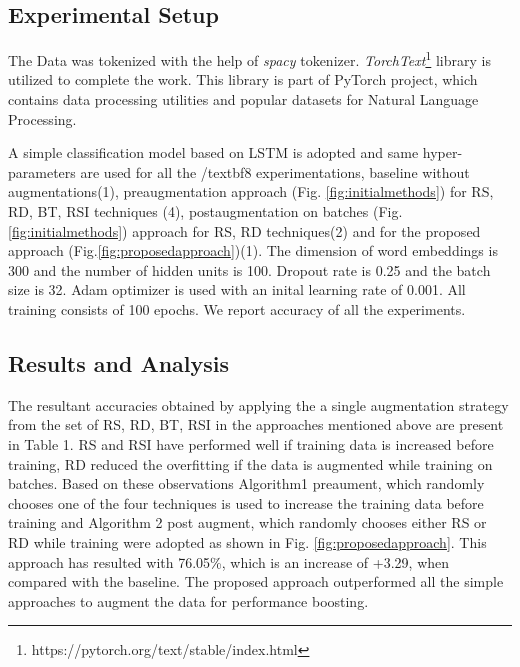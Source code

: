 \documentclass{article}
\begin{document}
\subsection{Experimental Setup}
The Data was tokenized with the help of \textit{spacy}\cite{srinivasa2018natural} tokenizer. \textit{TorchText}\footnote{https://pytorch.org/text/stable/index.html} library is utilized to complete the work. This library is part of PyTorch project, which contains data processing utilities and popular datasets for Natural Language Processing. 

A simple classification model based on LSTM is adopted and same hyper-parameters are used for all the /textbf{8} experimentations, baseline without augmentations(1), preaugmentation approach (Fig. \ref{fig:initialmethods}) for RS, RD, BT, RSI techniques (4), postaugmentation on batches (Fig. \ref{fig:initialmethods}) approach for RS, RD techniques(2) and for the proposed approach (Fig.\ref{fig:proposedapproach})(1). The dimension of word embeddings is 300 and the number of hidden units is 100. Dropout rate is 0.25 and the batch size is 32. Adam optimizer is used with an inital learning rate of 0.001. All training consists of 100 epochs. We report accuracy of all the experiments.

\subsection{Results and Analysis}
The resultant accuracies obtained by applying the a single augmentation strategy from the set of RS, RD, BT, RSI in the approaches mentioned above are present in Table 1. RS and RSI have performed well if training data is increased before training, RD reduced the overfitting if the data is augmented while training on batches. Based on these observations Algorithm1 preaument, which randomly chooses one of the four techniques is used to increase the training data before training and Algorithm 2 post augment, which randomly chooses either RS or RD while training were adopted as shown in Fig. \ref{fig:proposedapproach}. This approach has resulted with 76.05\%, which is an increase of +3.29, when compared with the baseline. The proposed approach outperformed all the simple approaches to augment the data for performance boosting. 
\end{document}
